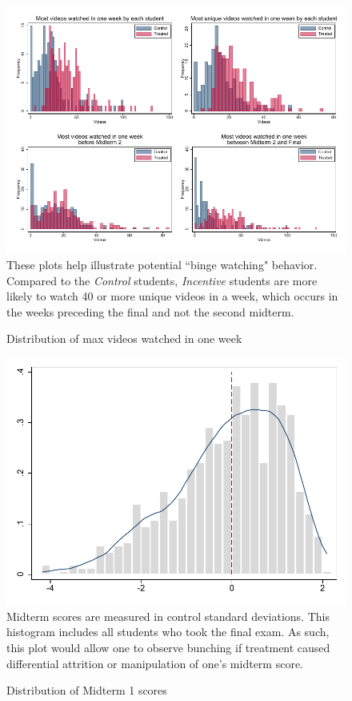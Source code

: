 \documentclass[12pt]{article}
\begin{document}
\clearpage
\begin{figure}[t]
\begin{center}
\caption{Distribution of max videos watched in one week}
\label{hist_binge}
\includegraphics[width=1\textwidth, angle=0]{../plots/hist_maxweek.pdf}
\footnotesize These plots help illustrate potential ``binge watching" behavior. Compared to the \textit{Control} students, \textit{Incentive} students are more likely to watch 40 or more unique videos in a week, which occurs in the weeks preceding the final and not the second midterm.
\end{center}
\end{figure}

\clearpage
\begin{figure}[t]
\begin{center}
\caption{Distribution of Midterm 1 scores}
\label{mid1dist}
\includegraphics[width=1\textwidth, angle=0]{../plots/mid1dist.pdf}
\footnotesize Midterm scores are measured in control standard deviations. This histogram includes all students who took the final exam. As such, this plot would allow one to observe bunching if treatment caused differential attrition or manipulation of one's midterm score.
\end{center}
\end{figure}
\end{document}
